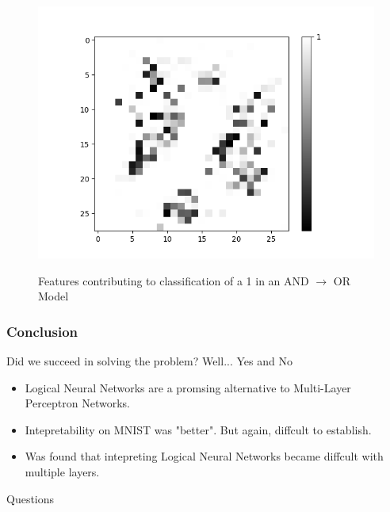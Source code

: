\documentclass{beamer}
\begin{document}
\begin{frame}
\begin{minipage}[t]{0.4\textwidth}
\begin{figure}[H]
		\medskip
		
		\begin{minipage}[b]{0.7\textwidth}
			\captionsetup{labelformat=empty}
			\includegraphics[width=\textwidth]{Images/AND-OR(W-LSM)(1)/Like/False/Layer0-Neuron-9.png}
			\label{}
		\end{minipage}
		\caption{Features contributing to classification of a 1 in an  AND $\rightarrow$ OR Model}
		\hfill
	\end{figure}

\end{minipage}
\end{frame}

\begin{frame}
\frametitle{Conclusion}

\begin{block}{Did we succeed in solving the problem? Well... Yes and No}
\begin{itemize}
\item Logical Neural Networks are a promsing alternative to Multi-Layer Perceptron Networks.
\item Intepretability on MNIST was "better". But again, diffcult to establish.
\item Was found that intepreting Logical Neural Networks became diffcult with multiple layers.
\end{itemize}
\end{block}
\end{frame}

\begin{frame}
\begin{center}
\huge Questions
\end{center}
\end{frame}
\end{document}
